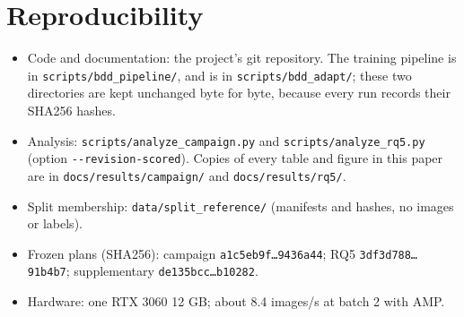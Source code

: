 
\section{Reproducibility}\label{sec:repro}

\begin{itemize}\raggedright
\item Code and documentation: the project's git repository. The training pipeline is in \texttt{scripts/bdd\_pipeline/}, and \aldi is in \texttt{scripts/bdd\_adapt/}; these two directories are kept unchanged byte for byte, because every run records their SHA256 hashes.
\item Analysis: \texttt{scripts/analyze\_campaign.py} and \texttt{scripts/analyze\_rq5.py} (option \texttt{-{}-revision-scored}). Copies of every table and figure in this paper are in \texttt{docs/results/campaign/} and \texttt{docs/results/rq5/}.
\item Split membership: \texttt{data/split\_reference/} (manifests and hashes, no images or labels).
\item Frozen plans (SHA256): campaign \texttt{a1c5eb9f\ldots9436a44}; RQ5 \texttt{3df3d788\ldots91b4b7}; supplementary \texttt{de135bcc\ldots b10282}.
\item Hardware: one RTX 3060 12 GB; about 8.4 images/s at batch 2 with AMP.
\end{itemize}
